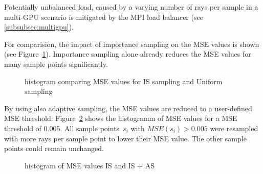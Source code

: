 Potentially unbalanced load, caused by a varying number of rays per sample 
in a multi-GPU scenario is mitigated by the MPI load balancer (see \cref{subsubsec:multigpu}).

For comparision, the impact of importance sampling
on the MSE values is shown (see Figure~\ref{plot:importance2}). 
Importance sampling alone already reduces the MSE values for
many sample points significantly.
\begin{figure}[H]
  \centerline{
    }
  \caption{histogram comparing MSE values for IS sampling and Uniform sampling}
  \label{plot:importance2}
\end{figure}
By using also adaptive sampling, the MSE values are reduced to a user-defined MSE threshold.
Figure~\ref{plot:adaptive} shows the histogramm of MSE values for a MSE threshold
of $0.005$. All sample points~$s_i$ with $MSE(s_i) > 0.005$ were resampled with more rays
per sample point to lower their MSE value. The other sample points could remain unchanged.
\begin{figure}[H]
  \centerline{
    }
  \caption{histogram of MSE values IS and IS + AS}
  \label{plot:adaptive}
\end{figure}
